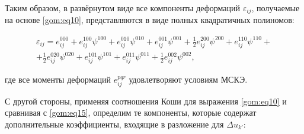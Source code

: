 Таким образом, в развёрнутом виде все компоненты деформаций $\varepsilon_{ij}$, получаемые на основе \eqref{gom:eq10}, представляются в виде полных квадратичных полиномов:

\begin{multline}

\varepsilon_{ij}=e_{ij}^{000}+e_{ij}^{100}\psi^{100}+e_{ij}^{010}\psi^{010}+e_{ij}^{001}\psi^{001}+\frac{1}{2}e_{ij}^{200}\psi^{200}+

e_{ij}^{110}\psi^{110}+

\\

+\frac{1}{2}e_{ij}^{020}\psi^{020}+e_{ij}^{101}\psi^{101}+e_{ij}^{011}\psi^{011}+\frac{1}{2}e_{ij}^{002}\psi^{002}, 

\label{gom:eq15}

\end{multline}

где все моменты деформаций $e_{ij}^{pqr}$ удовлетворяют условиям МСКЭ.



С другой стороны, применяя соотношения Коши для выражения \eqref{gom:eq10} и сравнивая с \eqref{gom:eq15}, определим те компоненты, которые содержат дополнительные коэффициенты, входящие в разложение для $\Delta u_{k'}$:

